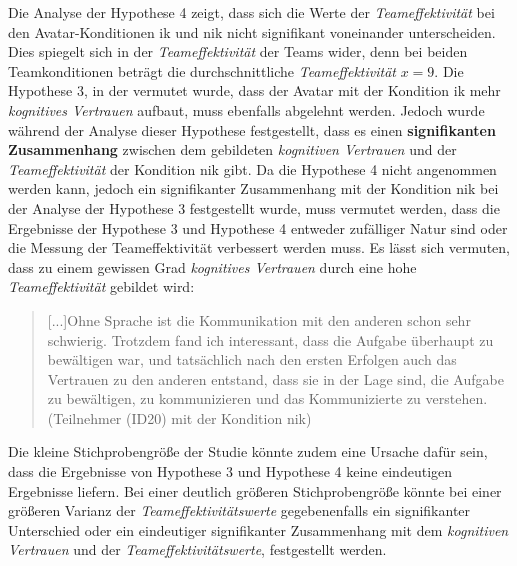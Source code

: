 \documentclass[a4paper,11pt]{article}%
\renewcommand{\\}{\vspace*{0.5\baselineskip} \newline}
\begin{document}
{{Die Analyse der Hypothese 4 zeigt, dass sich die Werte der \textit{Teameffektivität} bei den Avatar-Konditionen \ac{ik} und \ac{nik} nicht signifikant voneinander unterscheiden. Dies spiegelt sich in der \textit{Teameffektivität} der Teams wider, denn bei beiden Teamkonditionen beträgt die durchschnittliche \textit{Teameffektivität} $x = 9$.
Die Hypothese 3, in der vermutet wurde, dass der Avatar mit der Kondition \ac{ik} mehr \textit{kognitives Vertrauen} aufbaut, muss ebenfalls abgelehnt werden. Jedoch wurde während der Analyse dieser Hypothese festgestellt, dass es einen \textbf{signifikanten Zusammenhang} zwischen dem gebildeten \textit{kognitiven Vertrauen} und der \textit{Teameffektivität} der Kondition \ac{nik} gibt. Da die Hypothese 4 nicht angenommen werden kann, jedoch ein signifikanter Zusammenhang mit der Kondition \ac{nik} bei der Analyse der Hypothese 3 festgestellt wurde, muss vermutet werden, dass die Ergebnisse der Hypothese 3 und Hypothese 4 entweder zufälliger Natur sind oder die Messung der Teameffektivität verbessert werden muss.
Es lässt sich vermuten, dass zu einem gewissen Grad \textit{kognitives Vertrauen} durch eine hohe \textit{Teameffektivität} gebildet wird: 
\begin{quote}
\glqq{}[...]Ohne Sprache ist die Kommunikation mit den anderen schon sehr schwierig. Trotzdem fand ich interessant, dass die Aufgabe überhaupt zu bewältigen war, und tatsächlich nach den ersten Erfolgen auch das Vertrauen zu den anderen entstand, dass sie in der Lage sind, die Aufgabe zu bewältigen, zu kommunizieren und das Kommunizierte zu verstehen.\dq{} (Teilnehmer (ID20) mit der Kondition \ac{nik}) 
\end{quote}

Die kleine Stichprobengröße der Studie könnte zudem eine Ursache dafür sein, dass die Ergebnisse von Hypothese 3 und Hypothese 4 keine eindeutigen Ergebnisse liefern. Bei einer deutlich größeren Stichprobengröße könnte bei einer größeren Varianz der \textit{Teameffektivitätswerte} gegebenenfalls ein signifikanter Unterschied oder ein eindeutiger signifikanter Zusammenhang mit dem \textit{kognitiven Vertrauen} und der \textit{Teameffektivitätswerte}, festgestellt werden.




}}
\end{document}

